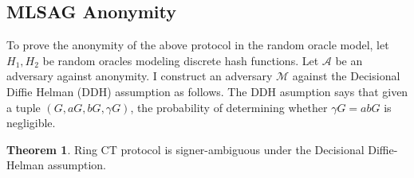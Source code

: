 \documentclass[12pt,english]{mrl}
\theoremstyle{definition}
\newtheorem{thm}[lem]{Theorem}
\numberwithin{equation}{section}
\numberwithin{figure}{section}
\numberwithin{equation}{section}
\numberwithin{equation}{section}
\numberwithin{figure}{section}
\begin{document}
\subsection{MLSAG Anonymity}
To prove the anonymity of the above protocol in the random oracle
model, let $H_{1},H_{2}$ be random oracles modeling discrete hash
functions. Let $\mathcal{A}$ be an adversary against anonymity. I
construct an adversary $\mathcal{M}$ against the Decisional Diffie Helman
(DDH) assumption as follows.
The DDH asumption says that given a
tuple $\left(G,aG,bG,\gamma G\right)$, the probability of determining
whether $\gamma G=abG$ is negligible. 
\begin{thm}
\label{thm:Ring-CT-protocol}Ring CT protocol is signer-ambiguous
under the Decisional Diffie-Helman assumption. \end{thm}
\end{document}
